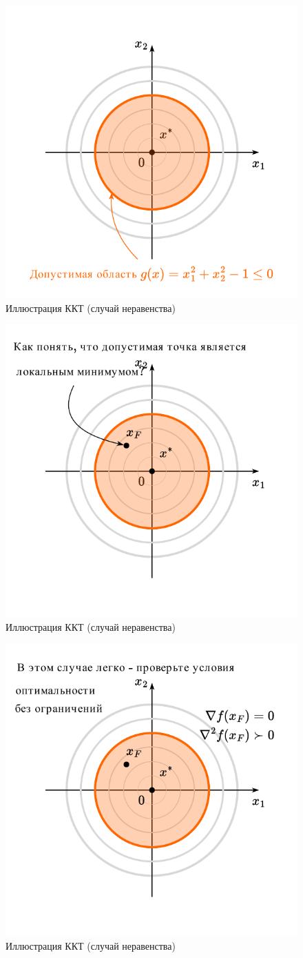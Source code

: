 \documentclass[
  russian,
  letterpaper,
  DIV=11,
  numbers=noendperiod]{scrartcl}
\begin{document}
\begin{figure}[H]

{\centering \includegraphics[width=0.5\linewidth,height=\textheight,keepaspectratio]{graphon-ineq_constr_2_ru.pdf}

}

\caption{Иллюстрация ККТ (случай неравенства)}

\end{figure}%

\begin{figure}[H]

{\centering \includegraphics[width=0.5\linewidth,height=\textheight,keepaspectratio]{graphon-ineq_constr_3_ru.pdf}

}

\caption{Иллюстрация ККТ (случай неравенства)}

\end{figure}%

\begin{figure}[H]

{\centering \includegraphics[width=0.5\linewidth,height=\textheight,keepaspectratio]{graphon-ineq_constr_4_ru.pdf}

}

\caption{Иллюстрация ККТ (случай неравенства)}

\end{figure}%
\end{document}
